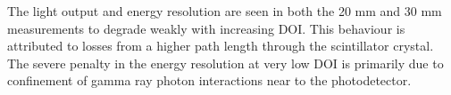 The light output and energy resolution are seen in both the 20 mm and 30 mm measurements to degrade weakly with increasing DOI. This behaviour is attributed to losses from a higher path length through the scintillator crystal. The severe penalty in the energy resolution at very low DOI is primarily due to confinement of gamma ray photon interactions near to the photodetector.
